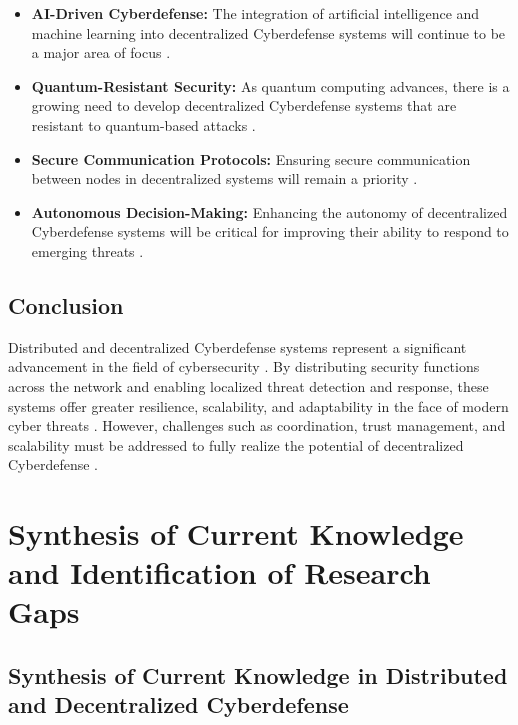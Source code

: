 \begin{itemize}
    \item \textbf{AI-Driven Cyberdefense:} The integration of artificial intelligence and machine learning into decentralized Cyberdefense systems will continue to be a major area of focus \cite{Kaur2023}.
    
    \item \textbf{Quantum-Resistant Security:} As quantum computing advances, there is a growing need to develop decentralized Cyberdefense systems that are resistant to quantum-based attacks \cite{Bernstein2017}.
    
    \item \textbf{Secure Communication Protocols:} Ensuring secure communication between nodes in decentralized systems will remain a priority \cite{Granjal2015}.
    
    \item \textbf{Autonomous Decision-Making:} Enhancing the autonomy of decentralized Cyberdefense systems will be critical for improving their ability to respond to emerging threats \cite{Nguyen2019}.
\end{itemize}

\subsection{Conclusion}

Distributed and decentralized Cyberdefense systems represent a significant advancement in the field of cybersecurity \cite{Christidis2016}. By distributing security functions across the network and enabling localized threat detection and response, these systems offer greater resilience, scalability, and adaptability in the face of modern cyber threats \cite{Roman2013}. However, challenges such as coordination, trust management, and scalability must be addressed to fully realize the potential of decentralized Cyberdefense \cite{Xu2019}.



\section{Synthesis of Current Knowledge and Identification of Research Gaps}

\subsection{Synthesis of Current Knowledge in Distributed and Decentralized Cyberdefense}

